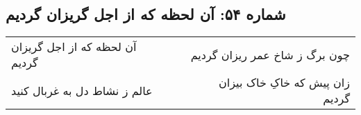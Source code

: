 \begin{center}
\section*{شماره ۵۴: آن لحظه که از اجل گریزان گردیم}
\label{sec:054}
\begin{longtable}{l p{0.5cm} r}
آن لحظه که از اجل گریزان گردیم
&&
چون برگ ز شاخ عمر ریزان گردیم
\\
عالم ز نشاط دل به غربال کنید
&&
زان پیش که خاکِ خاک بیزان گردیم
\\
\end{longtable}
\end{center}
